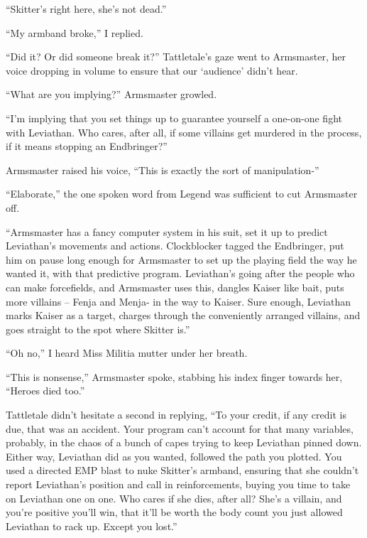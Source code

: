 ``Skitter's right here, she's not dead.''



``My armband broke,'' I replied.



``Did it?  Or did someone break it?''  Tattletale's gaze went to Armsmaster, her voice dropping in volume to ensure that our `audience' didn't hear.



``What are you implying?''  Armsmaster growled.



``I'm implying that you set things up to guarantee yourself a one-on-one fight with Leviathan.  Who cares, after all, if some villains get murdered in the process, if it means stopping an Endbringer?''



Armsmaster raised his voice, ``This is exactly the sort of manipulation-''



``Elaborate,'' the one spoken word from Legend was sufficient to cut Armsmaster off.



``Armsmaster has a fancy computer system in his suit, set it up to predict Leviathan's movements and actions.  Clockblocker tagged the Endbringer, put him on pause long enough for Armsmaster to set up the playing field the way he wanted it, with that predictive program.  Leviathan's going after the people who can make forcefields, and Armsmaster uses this, dangles Kaiser like bait, puts more villains – Fenja and Menja- in the way to Kaiser.  Sure enough, Leviathan marks Kaiser as a target, charges through the conveniently arranged villains, and goes straight to the spot where Skitter is.''



``Oh no,'' I heard Miss Militia mutter under her breath.



``This is nonsense,'' Armsmaster spoke, stabbing his index finger towards her, ``Heroes died too.''



Tattletale didn't hesitate a second in replying, ``To your credit, if any credit is due, that was an accident.  Your program can't account for that many variables, probably, in the chaos of a bunch of capes trying to keep Leviathan pinned down.  Either way, Leviathan did as you wanted, followed the path you plotted.  You used a directed EMP blast to nuke Skitter's armband, ensuring that she couldn't report Leviathan's position and call in reinforcements, buying you time to take on Leviathan one on one.  Who cares if she dies, after all?  She's a villain, and you're positive you'll win, that it'll be worth the body count you just allowed Leviathan to rack up.  Except you lost.''



